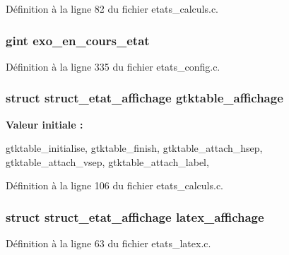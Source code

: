 Définition à la ligne 82 du fichier etats\_\-calculs.c.

\subsubsection[{exo\_\-en\_\-cours\_\-etat}]{\setlength{\rightskip}{0pt plus 5cm}gint {\bf exo\_\-en\_\-cours\_\-etat}}\label{etats__calculs_8c_a56b05d8c0d7da3d30651f195bb372762}


Définition à la ligne 335 du fichier etats\_\-config.c.

\subsubsection[{gtktable\_\-affichage}]{\setlength{\rightskip}{0pt plus 5cm}struct {\bf struct\_\-etat\_\-affichage} {\bf gtktable\_\-affichage}}\label{etats__calculs_8c_ad2d63b63790f190b5017e7b721f6f52c}
{\bfseries Valeur initiale :}
\begin{DoxyCode}
 {
    gtktable_initialise,
    gtktable_finish,
    gtktable_attach_hsep,
    gtktable_attach_vsep,
    gtktable_attach_label,
}
\end{DoxyCode}


Définition à la ligne 106 du fichier etats\_\-calculs.c.

\subsubsection[{latex\_\-affichage}]{\setlength{\rightskip}{0pt plus 5cm}struct {\bf struct\_\-etat\_\-affichage} {\bf latex\_\-affichage}}\label{etats__calculs_8c_aa79551ad1b2719219e91f89607c560d8}


Définition à la ligne 63 du fichier etats\_\-latex.c.

